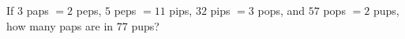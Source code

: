 If $3$ paps $=2$ peps, $5$ peps $=11$ pips, $32$ pips $=3$ pops, and $57$ pops $=2$ pups, how many paps are in $77$ pups?
